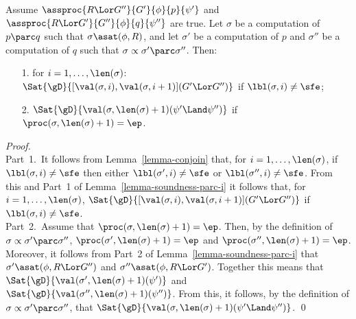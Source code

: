 \documentclass[runningheads]{llncs}
\begin{document}
\begin{lemma}
\label{lemma-soundness-parc-ii}
Assume $\assproc{R \Lor G''}{G'}{\phi}{p}{\psi'}$ and
$\assproc{R \Lor G'}{G''}{\phi}{q}{\psi''}$ are true.
Let $\sigma$ be a computation of $p \parc q$ such that
$\sigma \asat(\phi,R)$, and
let $\sigma'$ be a computation of $p$ and $\sigma''$ be a computation of 
$q$ such that $\sigma \propto \sigma' \parc \sigma''$.
Then:
\begin{enumerate}
\item[\textup{1.}]
for $i = 1, \ldots, \len(\sigma)$: 
\\ \hspace*{1.25em}
$\Sat{\gD}{[\val(\sigma,i),\val(\sigma,i+1)](G' \Lor G'')}$ 
if $\lbl(\sigma,i) \neq \sfe$;
\item[\textup{2.}]
$\Sat{\gD}{\val(\sigma,\len(\sigma)+1)(\psi' \Land \psi'')}$ 
if $\proc(\sigma,\len(\sigma)+1) = \ep$.
\end{enumerate}
\end{lemma}
%
\begin{proof}
\mbox{} \\
Part~1.\,
It follows from Lemma~\ref{lemma-conjoin} that, for 
$i = 1, \ldots, \len(\sigma)$, if $\lbl(\sigma,i) \neq \sfe$ then
either $\lbl(\sigma',i) \neq \sfe$ or $\lbl(\sigma'',i) \neq \sfe$.
From this and Part~1 of Lemma~\ref{lemma-soundness-parc-i} it follows 
that, for $i = 1, \ldots, \len(\sigma)$, 
$\Sat{\gD}{[\val(\sigma,i),\val(\sigma,i+1)](G' \Lor G'')}$ if 
$\lbl(\sigma,i) \neq \sfe$.
\\[1ex]
Part~2.\,
Assume that $\proc(\sigma,\len(\sigma)+1) = \ep$.
Then, by the definition of $\sigma \propto \sigma' \parc \sigma''$,
$\proc(\sigma',\len(\sigma)+1) = \ep$ and
$\proc(\sigma'',\len(\sigma)+1) = \ep$.
Moreover, it follows from Part~2 of Lemma~\ref{lemma-soundness-parc-i} 
that $\sigma' \asat(\phi,R \Lor G'')$ and 
$\sigma'' \asat(\phi,R \Lor G')$.
Together this means that 
$\Sat{\gD}{\val(\sigma',\len(\sigma)+1)(\psi')}$ and
$\Sat{\gD}{\val(\sigma'',\len(\sigma)+1)(\psi'')}$.
From this, it follows, by the definition of 
$\sigma \propto \sigma' \parc \sigma''$, that
$\Sat{\gD}{\val(\sigma,\len(\sigma)+1)\linebreak[2](\psi' \Land \psi'')}$.
\qed
\end{proof}
\end{document}
